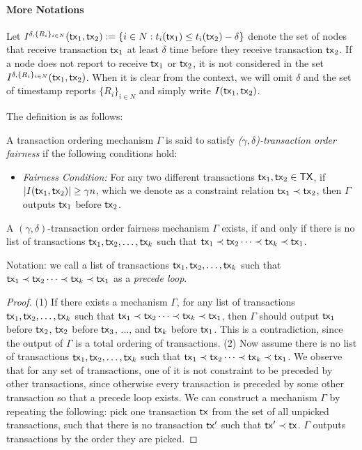 \documentclass[runningheads]{llncs}
\begin{document}
\paragraph{More Notations} Let $I^{\delta,\{R_i\}_{i\in N}}(\mathsf{tx}_1, \mathsf{tx}_2):=\{i\in N: t_i(\mathsf{tx}_1) \le t_i(\mathsf{tx}_2)-\delta \}$ denote the set of nodes that receive transaction $\mathsf{tx}_1$ at least $\delta$ time before they receive transaction $\mathsf{tx}_2$. If a node does not report to receive $\mathsf{tx}_1$ or $\mathsf{tx}_2$, it is not considered in the set $I^{\delta,\{R_i\}_{i\in N}}(\mathsf{tx}_1, \mathsf{tx}_2)$. When it is clear from the context, we will omit $\delta$ and the set of timestamp reports $\{R_i\}_{i\in N}$ and simply write $I(\mathsf{tx}_1, \mathsf{tx}_2)$.

The definition is as follows: 
\begin{definition}
A transaction ordering mechanism $\Gamma$ is said to satisfy \emph{($\gamma,\delta$)-transaction order fairness} if the following conditions hold:
\begin{itemize}
\item \emph{Fairness Condition:} For any two different transactions $\mathsf{tx}_1, \mathsf{tx}_2\in \mathsf{TX}$, if $|I(\mathsf{tx}_1, \mathsf{tx}_2)|\ge \gamma n$, which we denote as a constraint relation $\mathsf{tx}_1\prec \mathsf{tx}_2$, then $\Gamma$ outputs $\mathsf{tx}_1$ before $\mathsf{tx}_2$.
\end{itemize}
\end{definition}


\begin{lemma}
A $(\gamma,\delta)$-transaction order fairness mechanism $\Gamma$ exists, if and only if there is no list of transactions $\mathsf{tx}_1, \mathsf{tx}_2,\dots, \mathsf{tx}_k$ such that $\mathsf{tx}_1\prec \mathsf{tx}_2\cdots \prec \mathsf{tx}_k \prec \mathsf{tx}_1$. 
\end{lemma}

Notation: we call a list of transactions $\mathsf{tx}_1, \mathsf{tx}_2,\dots, \mathsf{tx}_k$ such that $\mathsf{tx}_1\prec \mathsf{tx}_2\cdots \prec \mathsf{tx}_k \prec \mathsf{tx}_1$ as a \emph{precede loop}.

\begin{proof} 
    (1) If there exists a mechanism $\Gamma$, for any list of transactions $\mathsf{tx}_1, \mathsf{tx}_2,\dots, \mathsf{tx}_k$ such that $\mathsf{tx}_1\prec \mathsf{tx}_2\cdots \prec \mathsf{tx}_k \prec \mathsf{tx}_1$, then $\Gamma$ should output $\mathsf{tx}_1$ before $\mathsf{tx}_2$, $\mathsf{tx}_2$ before $\mathsf{tx}_3$, ..., and $\mathsf{tx}_k$ before $\mathsf{tx}_1$. This is a contradiction, since the output of $\Gamma$ is a total ordering of transactions.
    (2) Now assume there is no list of transactions $\mathsf{tx}_1, \mathsf{tx}_2,\dots, \mathsf{tx}_k$ such that $\mathsf{tx}_1\prec \mathsf{tx}_2\cdots \prec \mathsf{tx}_k \prec \mathsf{tx}_1$. We observe that for any set of transactions, one of it is not constraint to be preceded by other transactions, since otherwise every transaction is preceded by some other transaction so that a precede loop exists. We can construct a mechanism $\Gamma$ by repeating the following: pick one transaction $\mathsf{tx}$ from the set of all unpicked transactions, such that there is no transaction $\mathsf{tx}'$ such that $\mathsf{tx}'\prec \mathsf{tx}$. $\Gamma$ outputs transactions by the order they are picked. 
\end{proof}
\end{document}
